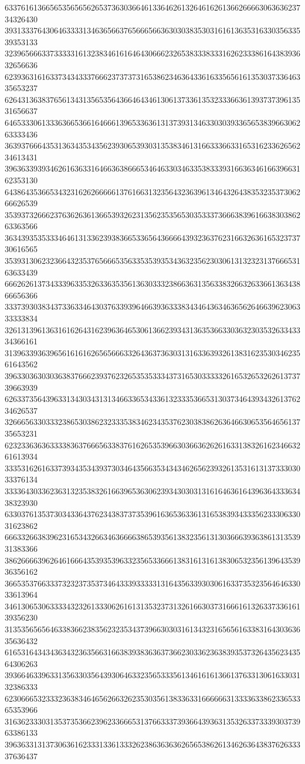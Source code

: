 63376161366565356565626537363036646133646261326461626136626666306363623734326430
39313337643064633331346365663765666566363030383530316161363531633035633539353133
32396566633733333161323834616164643066623265383338333162623338616438393632656636
62393631616337343433376662373737316538623463643361633565616135303733646335653237
62643136383765613431356535643664643461306137336135323336636139373739613531656637
64653330613336366536616466613965336361313739313463303039336565383966306263333436
36393766643531363435343562393065393031353834613166333663316531623362656234613431
39636339393462616363316466363866653464633034633538333931663634616639663162353130
64386435366534323162626666613761663132356432363961346432643835323537306266626539
35393732666237636263613665393262313562353565303533373666383961663830386263363566
36343935353334646131336239383665336564366664393236376231663263616532373730616565
35393130623236643235376566653563353539353436323562303061313232313766653163633439
66626261373433396335326336353561363033323866363135633832663263366136343866656366
33373930383437336334643037633939646639363338343464363463656264663962306333333834
32613139613631616264316239636465306136623934313635366330363230353263343334366161
31396339363965616161626565666332643637363031316336393261383162353034623561643562
39633036303036383766623937623265353533343731653033333261653265326261373739663939
62633735643963313430343131346633653433613233353665313037346439343261376234626537
32666563303332386530386232333538346234353762303838626364663065356465613735653231
62323363636333383637666563383761626535396630366362626163313832616234663261613934
33353162616337393435343937303464356635343434626562393261353161313733303033376134
33336430336236313235383261663965363062393430303131616463616439636433363438323930
63303761353730343364376234383737353961636536336131653839343335623330633031623862
66633266383962316534326634636666386539356138323561313036663936386131353931383366
38626666396264616664353935396332356533666138316131613830653235613964353936356162
36653537663337323237353734643339333331316435633930306163373532356464633033613964
34613065306333343232613330626161313532373132616630373166616132633733616139356230
31353565656463383662383562323534373966303031613432316565616338316430363635636432
61653164343436343236356631663839383636373662303362363839353732643562343564306263
39366463396331356330356439306463323565333561346161613661376331306163303132386333
62306665323332363834646562663262353035613833633166666631333363386233653365353966
31636233303135373536623962336665313766333739366439363135326337333930373963386133
39636331313730636162333133613332623863636362656538626134626364383762633337636437
